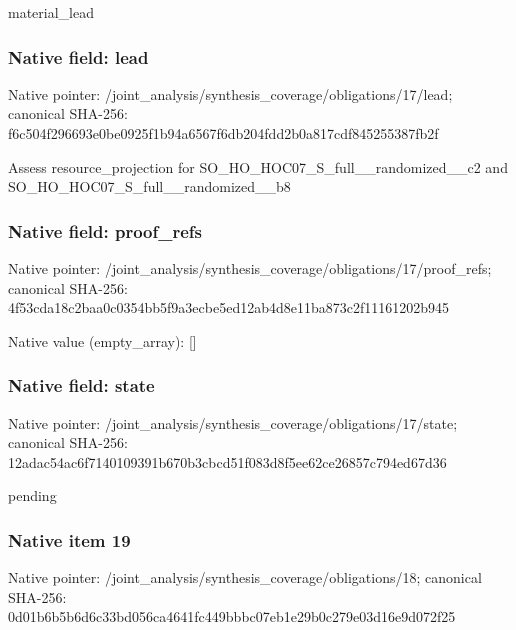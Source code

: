 \documentclass[10pt,a4paper]{article}
\begin{document}
\begingroup\raggedright\sloppy material\_\allowbreak{}lead\par\endgroup

\subsubsection{Native field: lead}
Native pointer: /joint\_\allowbreak{}analysis/synthesis\_\allowbreak{}coverage/obligations/17/lead; canonical SHA-256: f6c504f296693e0be0925f1b94a6567f6db204fdd2b0a817cdf845255387fb2f

\begingroup\raggedright\sloppy Assess resource\_\allowbreak{}projection for SO\_\allowbreak{}HO\_\allowbreak{}HOC07\_\allowbreak{}S\_\allowbreak{}full\_\allowbreak{}\_\allowbreak{}randomized\_\allowbreak{}\_\allowbreak{}c2 and SO\_\allowbreak{}HO\_\allowbreak{}HOC07\_\allowbreak{}S\_\allowbreak{}full\_\allowbreak{}\_\allowbreak{}randomized\_\allowbreak{}\_\allowbreak{}b8\par\endgroup

\subsubsection{Native field: proof\_\allowbreak{}refs}
Native pointer: /joint\_\allowbreak{}analysis/synthesis\_\allowbreak{}coverage/obligations/17/proof\_\allowbreak{}refs; canonical SHA-256: 4f53cda18c2baa0c0354bb5f9a3ecbe5ed12ab4d8e11ba873c2f11161202b945

Native value (empty\_\allowbreak{}array): []

\subsubsection{Native field: state}
Native pointer: /joint\_\allowbreak{}analysis/synthesis\_\allowbreak{}coverage/obligations/17/state; canonical SHA-256: 12adac54ac6f7140109391b670b3cbcd51f083d8f5ee62ce26857c794ed67d36

\begingroup\raggedright\sloppy pending\par\endgroup

\subsubsection{Native item 19}
Native pointer: /joint\_\allowbreak{}analysis/synthesis\_\allowbreak{}coverage/obligations/18; canonical SHA-256: 0d01b6b5b6d6c33bd056ca4641fc449bbbc07eb1e29b0c279e03d16e9d072f25
\end{document}
